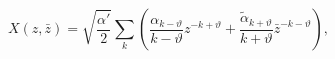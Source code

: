 \begin{equation}
X(z,\bar{z})=\sqrt{\frac{\alpha'}{2}}\sum_{k}\left( \frac{\alpha_{k-\vartheta}}{k-\vartheta}z^{-k+\vartheta}+\frac{\tilde{\alpha}_{k+\vartheta}}{k+\vartheta}\bar{z}^{-k-\vartheta}\right),
\end{equation}

